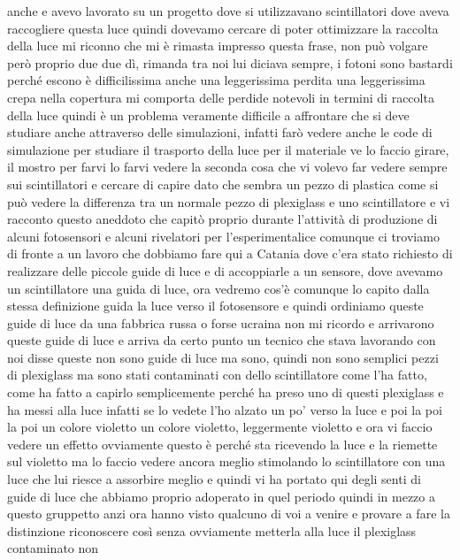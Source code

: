 anche e avevo lavorato su un progetto dove si utilizzavano scintillatori dove aveva raccogliere questa luce quindi dovevamo cercare di poter ottimizzare la raccolta della luce mi riconno che mi è rimasta impresso questa frase, non può volgare però proprio due due dì, rimanda tra noi lui diciava sempre, i fotoni sono bastardi perché escono è difficilissima anche una leggerissima perdita una leggerissima crepa nella copertura mi comporta delle perdide notevoli in termini di raccolta della luce quindi è un problema veramente difficile a affrontare che si deve studiare anche attraverso delle simulazioni, infatti farò vedere anche le code di simulazione per studiare il trasporto della luce per il materiale ve lo faccio girare, il mostro per farvi lo farvi vedere la seconda cosa che vi volevo far vedere sempre sui scintillatori e cercare di capire dato che sembra un pezzo di plastica come si può vedere la differenza tra un normale pezzo di plexiglass e uno scintillatore e vi racconto questo aneddoto che capitò proprio durante l'attività di produzione di alcuni fotosensori e alcuni rivelatori per l'esperimentalice comunque ci troviamo di fronte a un lavoro che dobbiamo fare qui a Catania dove c'era stato richiesto di realizzare delle piccole guide di luce e di accoppiarle a un sensore, dove avevamo un scintillatore una guida di luce, ora vedremo cos'è comunque lo capito dalla stessa definizione guida la luce verso il fotosensore e quindi ordiniamo queste guide di luce da una fabbrica russa o forse ucraina non mi ricordo e arrivarono queste guide di luce e arriva da certo punto un tecnico che stava lavorando con noi disse queste non sono guide di luce ma sono, quindi non sono semplici pezzi di plexiglass ma sono stati contaminati con dello scintillatore come l'ha fatto, come ha fatto a capirlo semplicemente perché ha preso uno di questi plexiglass e ha messi alla luce infatti se lo vedete l'ho alzato un po' verso la luce e poi la poi la poi un colore violetto un colore violetto, leggermente violetto e ora vi faccio vedere un effetto ovviamente questo è perché sta ricevendo la luce e la riemette sul violetto ma lo faccio vedere ancora meglio stimolando lo scintillatore con una luce che lui riesce a assorbire meglio e quindi vi ha portato qui degli senti di guide di luce che abbiamo proprio adoperato in quel periodo quindi in mezzo a questo gruppetto anzi ora hanno visto qualcuno di voi a venire e provare a fare la distinzione riconoscere così senza ovviamente metterla alla luce il plexiglass contaminato non


